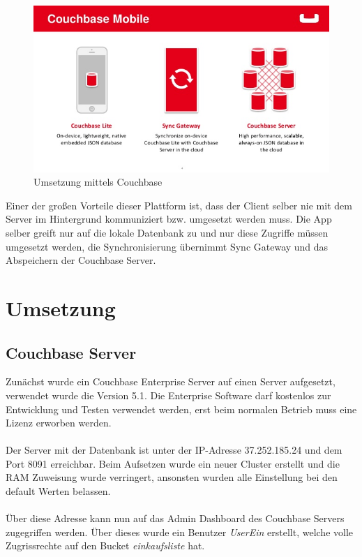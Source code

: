 \begin{figure}[H]
	\centering
	\includegraphics[width=0.9\linewidth]{img/building-net-apps-using-couchbase-lite-4-638}
	\caption{Umsetzung mittels Couchbase}
	\label{fig:building-net-apps-using-couchbase-lite-4-638}
\end{figure}

Einer der großen Vorteile dieser Plattform ist, dass der Client selber nie mit dem Server im Hintergrund kommuniziert bzw. umgesetzt werden muss. Die App selber greift nur auf die lokale Datenbank zu und nur diese Zugriffe müssen umgesetzt werden, die Synchronisierung übernimmt Sync Gateway und das Abspeichern der Couchbase Server. \cite{couchbaseapp}


\section{Umsetzung}

\subsection{Couchbase Server}

Zunächst wurde ein Couchbase Enterprise Server auf einen Server aufgesetzt, verwendet wurde die Version 5.1. Die Enterprise Software darf kostenlos zur Entwicklung und Testen verwendet werden, erst beim normalen Betrieb muss eine Lizenz erworben werden.
\\\\
Der Server mit der Datenbank ist unter der IP-Adresse 37.252.185.24 und dem Port 8091 erreichbar. Beim Aufsetzen wurde ein neuer Cluster erstellt und die RAM Zuweisung wurde verringert, ansonsten wurden alle Einstellung bei den default Werten belassen.
\\\\
Über diese Adresse kann nun auf das Admin Dashboard des Couchbase Servers zugegriffen werden. Über dieses wurde ein Benutzer \textit{UserEin} erstellt, welche volle Zugrissrechte auf den Bucket \textit{einkaufsliste} hat. \cite{couchbaseintro}

